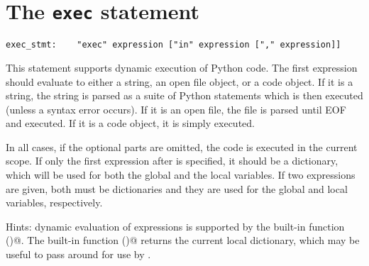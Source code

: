 \section{The {\tt exec} statement} \label{exec}

\begin{verbatim}
exec_stmt:    "exec" expression ["in" expression ["," expression]]
\end{verbatim}

This statement supports dynamic execution of Python code.  The first
expression should evaluate to either a string, an open file object, or
a code object.  If it is a string, the string is parsed as a suite of
Python statements which is then executed (unless a syntax error
occurs).  If it is an open file, the file is parsed until EOF and
executed.  If it is a code object, it is simply executed.

In all cases, if the optional parts are omitted, the code is executed
in the current scope.  If only the first expression after \verb@in@ is
specified, it should be a dictionary, which will be used for both the
global and the local variables.  If two expressions are given, both
must be dictionaries and they are used for the global and local
variables, respectively.

Hints: dynamic evaluation of expressions is supported by the built-in
function \verb@eval()@.  The built-in function \verb@vars()@ returns
the current local dictionary, which may be useful to pass around for
use by \verb@exec@.
